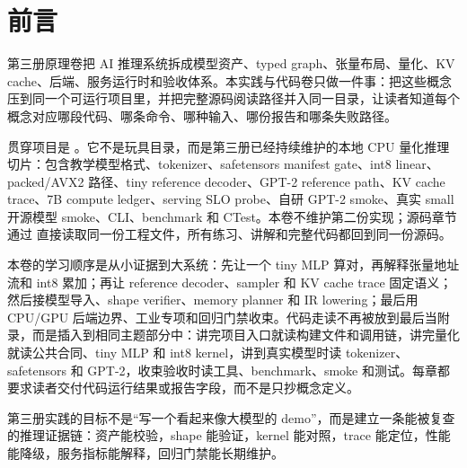 \chapter*{前言}

第三册原理卷把 AI 推理系统拆成模型资产、typed graph、张量布局、量化、KV cache、后端、服务运行时和验收体系。本实践与代码卷只做一件事：把这些概念压到同一个可运行项目里，并把完整源码阅读路径并入同一目录，让读者知道每个概念对应哪段代码、哪条命令、哪种输入、哪份报告和哪条失败路径。

贯穿项目是 。它不是玩具目录，而是第三册已经持续维护的本地 CPU 量化推理切片：包含教学模型格式、tokenizer、safetensors manifest gate、int8 linear、packed/AVX2 路径、tiny reference decoder、GPT-2 reference path、KV cache trace、7B compute ledger、serving SLO probe、自研 GPT-2 smoke、真实 small 开源模型 smoke、CLI、benchmark 和 CTest。本卷不维护第二份实现；源码章节通过  直接读取同一份工程文件，所有练习、讲解和完整代码都回到同一份源码。

本卷的学习顺序是从小证据到大系统：先让一个 tiny MLP 算对，再解释张量地址流和 int8 累加；再让 reference decoder、sampler 和 KV cache trace 固定语义；然后接模型导入、shape verifier、memory planner 和 IR lowering；最后用 CPU/GPU 后端边界、工业专项和回归门禁收束。代码走读不再被放到最后当附录，而是插入到相同主题部分中：讲完项目入口就读构建文件和调用链，讲完量化就读公共合同、tiny MLP 和 int8 kernel，讲到真实模型时读 tokenizer、safetensors 和 GPT-2，收束验收时读工具、benchmark、smoke 和测试。每章都要求读者交付代码运行结果或报告字段，而不是只抄概念定义。

\begin{keyidea}
第三册实践的目标不是“写一个看起来像大模型的 demo”，而是建立一条能被复查的推理证据链：资产能校验，shape 能验证，kernel 能对照，trace 能定位，性能能降级，服务指标能解释，回归门禁能长期维护。
\end{keyidea}
